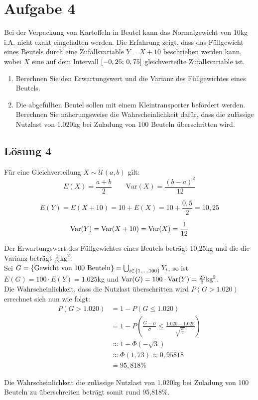 \documentclass[main.tex]{subfiles}
\begin{document}
\section{Aufgabe 4}
Bei der Verpackung von Kartoffeln in Beutel kann das Normalgewicht von $10$kg i.A. nicht exakt 
eingehalten werden. Die Erfahrung zeigt, dass das Füllgewicht eines Beutels durch eine Zufallsvariable
$Y=X+10$ beschrieben werden kann, wobei $X$ eine auf dem Intervall $[-0,25;\, 0,75]$ gleichverteilte Zufallsvariable ist.
\begin{enumerate}
\item Berechnen Sie den Erwartungswert und die Varianz des Füllgewichtes eines Beutels.
\item Die abgefüllten Beutel sollen mit einem Kleintransporter befördert werden. Berechnen Sie näherungsweise die Wahrscheinlichkeit dafür, dass die zulässige Nutzlast von $1.020$kg bei Zuladung von $100$ Beuteln überschritten wird.
\end{enumerate}

\subsection{Lösung 4}
Für eine Gleichverteilung $X\sim\mathcal{U}(a, b)$ gilt:
$$
	E(X) = \frac{a+b}{2}\qquad \text{Var}(X) = \frac{(b-a)^2}{12}
$$

$$
E(Y) = E(X+10) = 10 + E(X) = 10 + \frac{0,5}{2} = 10,25
$$

$$
\operatorname{Var}(Y) = \operatorname{Var}(X+10) = \operatorname{Var}(X) = \frac{1}{12}
$$

Der Erwartungswert des Füllgewichtes eines Beutels beträgt 10,25kg und die die Varianz beträgt $\frac{1}{12}\text{kg}^2$.\\

Sei $G =\{\text{Gewicht von 100 Beuteln}\} = \bigcup_{i\in\{1,\dots,100\}} Y_i$, so ist $E(G) = 100 \cdot E(Y) = 1.025$kg und $\operatorname{Var}(G) = 100 \cdot \operatorname{Var}(Y) = \frac{25}{3}\text{kg}^2$.\\

Die Wahrscheinlichkeit, dass die Nutzlast überschritten wird $P(G {>} 1.020)$ errechnet sich nun wie folgt:
$$\begin{aligned}
    P(G {>} 1.020) &= 1 - P(G{\leq} 1.020) \\
    &= 1 - P\left(
        \frac{G-\mu}{\sigma} \leq \frac{1.020 - 1.025}{\sqrt{\frac{25}{3}}}
    \right) \\
    &\approx 1 - \Phi \left(-\sqrt{3}\right) \\
    &\approx \Phi (1,73) \approx 0,95818 \\
    &= 95,818 \%
\end{aligned}$$

Die Wahrscheinlichkeit die zulässige Nutzlast von 1.020kg bei Zuladung von 100 Beuteln zu überschreiten beträgt somit rund 95,818\%.
\end{document}
